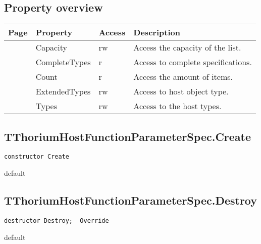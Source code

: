 \subsection{Property overview}
\label{thoriumcorepkg:thorium:tthoriumhostfunctionparameterspec:properties}
\begin{tabularx}{\textwidth}{lllX}
Page & Property & Access & Description \\ \hline
\pageref{thoriumcorepkg:thorium:tthoriumhostfunctionparameterspec:capacity} & Capacity & rw & Access the capacity of the list. \\
\pageref{thoriumcorepkg:thorium:tthoriumhostfunctionparameterspec:completetypes} & CompleteTypes & r & Access to complete specifications. \\
\pageref{thoriumcorepkg:thorium:tthoriumhostfunctionparameterspec:count} & Count & r & Access the amount of items. \\
\pageref{thoriumcorepkg:thorium:tthoriumhostfunctionparameterspec:extendedtypes} & ExtendedTypes & rw & Access to host object type. \\
\pageref{thoriumcorepkg:thorium:tthoriumhostfunctionparameterspec:types} & Types & rw & Access to the host types. \\
\hline
\end{tabularx}
\subsection{TThoriumHostFunctionParameterSpec.Create}
\label{thoriumcorepkg:thorium:tthoriumhostfunctionparameterspec:create}
\begin{FPCList}
\Declaration 

\begin{verbatim}
constructor Create
\end{verbatim}
\Visibility
default
\end{FPCList}
\subsection{TThoriumHostFunctionParameterSpec.Destroy}
\label{thoriumcorepkg:thorium:tthoriumhostfunctionparameterspec:destroy}
\begin{FPCList}
\Declaration 

\begin{verbatim}
destructor Destroy;  Override
\end{verbatim}
\Visibility
default
\end{FPCList}
